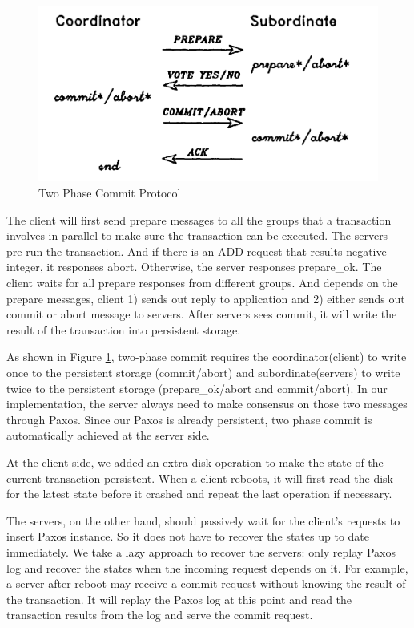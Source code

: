 \documentclass{vldb}
\begin{document}
\begin{figure}[h!]
  \centering
  \includegraphics[width = 0.8\linewidth]{figs/2PC.pdf}
  \caption{Two Phase Commit Protocol}
  \label{fig:2pc}
\end{figure}

The client will first send prepare messages to all the groups that a 
transaction involves in parallel to make sure the transaction can be 
executed. The servers pre-run the transaction. And if there is an ADD 
request that results negative integer, it responses abort. Otherwise, 
the server responses prepare\_ok. The client waits for all prepare 
responses from different groups. And depends on the prepare messages, 
client 1) sends out reply to application and 2) either sends out
commit or abort message to servers. After servers sees commit, it will 
write the result of the transaction into persistent storage.

As shown in Figure \ref{fig:2pc}, two-phase commit requires the 
coordinator(client) to write once to the persistent storage
(commit/abort) and subordinate(servers) to write twice to the 
persistent storage (prepare\_ok/abort and commit/abort). In our
implementation, the server always need to make consensus on those two 
messages through Paxos. Since our Paxos is already persistent, two 
phase commit is automatically achieved at the server side. 

At the client side, we added an extra disk operation to make the state 
of the current transaction persistent. When a client reboots, it will 
first read the disk for the latest state before it crashed and repeat 
the last operation if necessary. 

The servers, on the other hand, should passively wait for the client’s 
requests to insert Paxos instance. So it does not have to recover the 
states up to date immediately. We take a lazy approach to recover the 
servers: only replay Paxos log and recover the states when the 
incoming request depends on it. For example, a server after reboot may 
receive a commit request without knowing the result of the 
transaction. It will replay the Paxos log at this point and read the 
transaction results from the log and serve the commit request.
\end{document}

